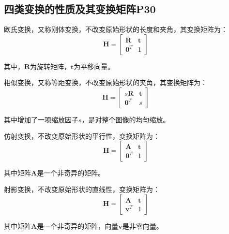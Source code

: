 \documentclass[11pt]{article}
\begin{document}
\subsection{四类变换的性质及其变换矩阵P30}
欧氏变换，又称刚体变换，不改变原始形状的长度和夹角，其变换矩阵为：
\begin{equation*}
  \mathbold{H}=\begin{bmatrix}
    \mathbold{R}   & \mathbold{t} \\
    \mathbold{0}^T & 1
  \end{bmatrix}
\end{equation*}\par
其中，$\mathbold{R}$为旋转矩阵，$\mathbold{t}$为平移向量。\par
相似变换，又称等距变换，不改变原始形状的夹角，其变换矩阵为：
\begin{equation*}
  \mathbold{H}=\begin{bmatrix}
    s\mathbold{R}  & \mathbold{t} \\
    \mathbold{0}^T & s
  \end{bmatrix}
\end{equation*}\par
其中增加了一项缩放因子$s$，是对整个图像的均匀缩放。\par
仿射变换，不改变原始形状的平行性，变换矩阵为：
\begin{equation*}
  \mathbold{H}=\begin{bmatrix}
    \mathbold{A}   & \mathbold{t} \\
    \mathbold{0}^T & 1
  \end{bmatrix}
\end{equation*}\par
其中矩阵$\mathbold{A}$是一个非奇异的矩阵。\par
射影变换，不改变原始形状的直线性，变换矩阵为：
\begin{equation*}
  \mathbold{H}=\begin{bmatrix}
    \mathbold{A}   & \mathbold{t} \\
    \mathbold{v}^T & 1
  \end{bmatrix}
\end{equation*}\par
其中矩阵$\mathbold{A}$是一个非奇异的矩阵，向量$\mathbold{v}$是非零向量。
\end{document}
